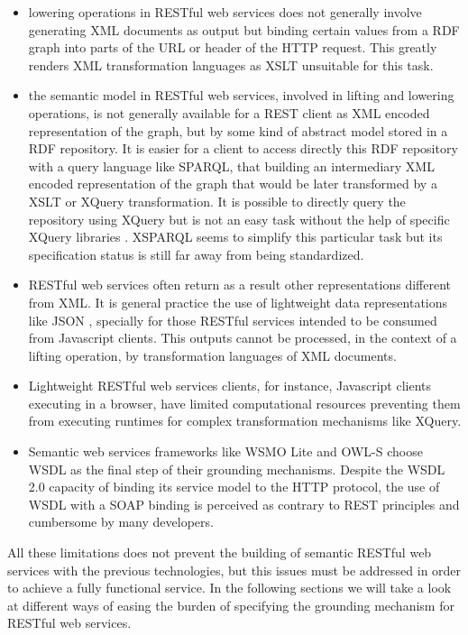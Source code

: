 \begin{itemize}
  \item lowering operations in RESTful web services does not generally involve generating XML documents as output but binding certain values from a RDF graph into parts of the URL or header of the HTTP request. This greatly renders XML transformation languages as XSLT unsuitable for this task.
 \item the semantic model in RESTful web services, involved in lifting and lowering operations, is not generally available for a REST client as XML encoded representation of the graph, but by some kind of abstract model stored in a RDF repository. It is easier for a client to access directly this RDF repository with a query language like SPARQL, that building an intermediary XML encoded representation of the graph that would be later transformed by a XSLT or XQuery transformation. It is possible to directly query the repository using XQuery but is not an easy task without the help of specific XQuery libraries \cite{xquery}. XSPARQL seems to simplify this particular task but its specification status is still far away from being standardized.
\item RESTful web services often return as a result other representations different from XML. It is general practice the use of lightweight data representations like JSON \cite{json}, specially for those RESTful services intended to be consumed from Javascript clients. This outputs cannot be processed, in the context of a lifting operation, by transformation languages of XML documents.
\item Lightweight RESTful web services clients, for instance, Javascript clients executing in a browser, have limited computational resources preventing them from executing runtimes for complex transformation mechanisms like XQuery.
\item Semantic web services frameworks like WSMO Lite and OWL-S choose WSDL as the final step of their grounding mechanisms. Despite the WSDL 2.0 capacity of binding its service model to the HTTP protocol, the use of WSDL with a SOAP binding is perceived as contrary to REST principles and cumbersome by many developers.
\end{itemize}

All these limitations does not prevent the building of semantic RESTful web services with the previous technologies, but this issues must be addressed in order to achieve a fully functional service. In the following sections we will take a look at different ways of easing the burden of specifying the grounding mechanism for RESTful web services.


